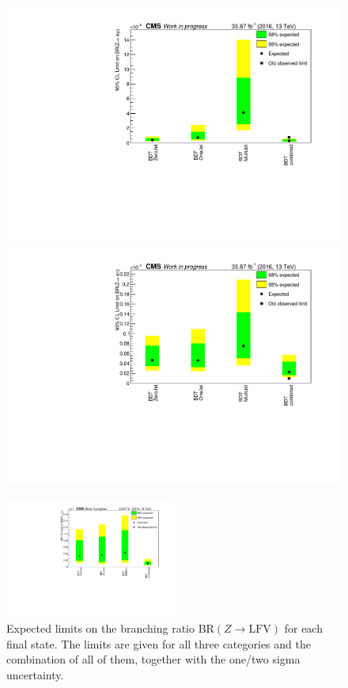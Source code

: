 \begin{figure}[htp]
	\centering
		
	\begin{multicols}{2}
		\includegraphics[width=\linewidth]{plots/em/limits.pdf}
		\includegraphics[width=\linewidth]{plots/et/limits.pdf}
	\end{multicols}

	\includegraphics[width=0.5\textwidth]{plots/mt/limits.pdf}

	\caption[Expected limits on the branching ratios]{Expected limits on the branching ratio $\text{BR}(Z\to\text{LFV})$ for each final state. The limits are given for all three categories and the combination of all of them, together with the one/two sigma uncertainty.}
	\label{fig:fig_5_1}


\end{figure}

